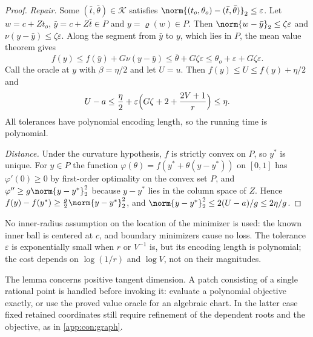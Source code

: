 \begin{proof}
\emph{Repair.} Some $(\bar t,\bar\theta)\in\mathcal K$ satisfies
$\norm{(t_o,\theta_o)-(\bar t,\bar\theta)}_2\le\varepsilon$. Let
$w=c+Zt_o$, $\bar y=c+Z\bar t\in P$ and $y=\varrho(w)\in P$. Then
$\norm{w-\bar y}_2\le\zeta\varepsilon$ and
$\nu(y-\bar y)\le\zeta\varepsilon$. Along the segment from $\bar y$ to $y$,
which lies in $P$, the mean value theorem gives
\[
 f(y)\le f(\bar y)+G\nu(y-\bar y)\le\bar\theta+G\zeta\varepsilon
 \le\theta_o+\varepsilon+G\zeta\varepsilon .
\]
Call the oracle at $y$ with $\beta=\eta/2$ and let $U=u$. Then
$f(y)\le U\le f(y)+\eta/2$ and
\[
 U-a\le\frac\eta2+\varepsilon\Bigl(G\zeta+2+\frac{2V+1}r\Bigr)\le\eta .
\]
All tolerances have polynomial encoding length, so the running time is
polynomial.

\emph{Distance.} Under the curvature hypothesis, $f$ is strictly convex on
$P$, so $y^*$ is unique. For $y\in P$ the function
$\varphi(\theta)=f(y^*+\theta(y-y^*))$ on $[0,1]$ has $\varphi'(0)\ge0$ by
first-order optimality on the convex set $P$, and
$\varphi''\ge g\norm{y-y^*}_2^2$ because $y-y^*$ lies in the column space of
$Z$. Hence $f(y)-f(y^*)\ge\frac g2\norm{y-y^*}_2^2$, and
$\norm{y-y^*}_2^2\le2(U-a)/g\le2\eta/g$.
\end{proof}

No inner-radius assumption on the location of the minimizer is used: the
known inner ball is centered at $c$, and boundary minimizers cause no loss.
The tolerance $\varepsilon$ is exponentially small when $r$ or $V^{-1}$ is,
but its encoding length is polynomial; the cost depends on $\log(1/r)$ and
$\log V$, not on their magnitudes.

The lemma concerns positive tangent dimension. A patch consisting of a
single rational point is handled before invoking it: evaluate a polynomial
objective exactly, or use the proved value oracle for an algebraic chart.
In the latter case fixed retained coordinates still require refinement of
the dependent roots and the objective, as in \cref{app:con:graph}.

